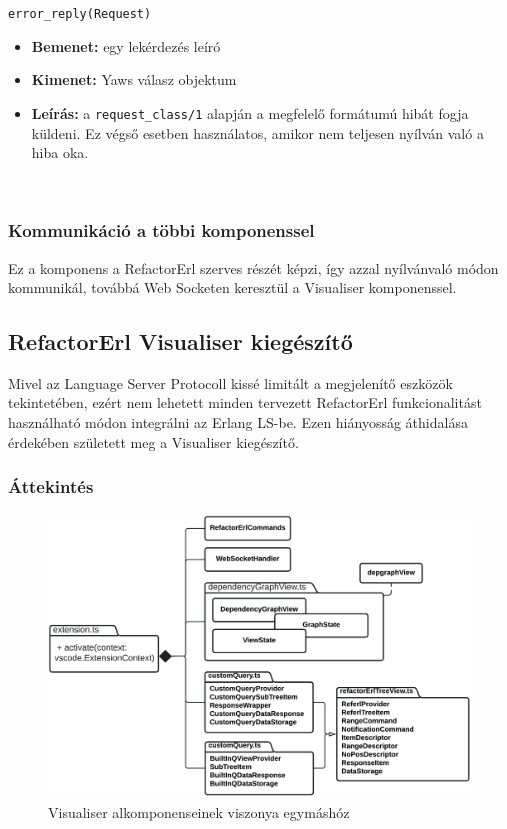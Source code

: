 \noindent \lstinline{error_reply(Request)}
\begin{itemize}
    \item \textbf{Bemenet:} egy lekérdezés leíró
    \item \textbf{Kimenet:} Yaws válasz objektum
    \item \textbf{Leírás:} a \lstinline{request_class/1} alapján a megfelelő formátumú hibát fogja küldeni. Ez végső esetben használatos, amikor nem teljesen nyílván való a hiba oka.
\end{itemize} \\




\subsubsection{Kommunikáció a többi komponenssel}

Ez a komponens a RefactorErl szerves részét képzi, így azzal nyílvánvaló módon kommunikál, továbbá Web Socketen keresztül a Visualiser komponenssel.


\subsection{RefactorErl Visualiser kiegészítő}

Mivel az Language Server Protocoll kissé limitált a megjelenítő eszközök tekintetében, ezért nem lehetett minden tervezett RefactorErl funkcionalitást használható módon integrálni az Erlang LS-be. Ezen hiányosság áthidalása érdekében született meg a Visualiser kiegészítő.

\subsubsection{Áttekintés}

\begin{figure}[H]
  \centering
  \includegraphics[width=\linewidth]{images/visualiser_arch.png}
  \caption{Visualiser alkomponenseinek viszonya egymáshóz}
  \label{fig:visualiserArch}
\end{figure}

